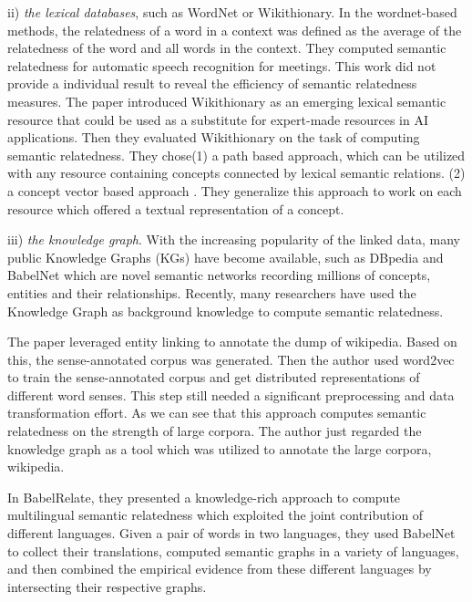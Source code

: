 ii) \emph{the lexical databases}, such as WordNet or Wikithionary. 
In the wordnet-based methods\cite{acl/Pucher07}, the relatedness of a word in a context was
defined as the average of the relatedness of the word and all words in the context. They computed
semantic relatedness for automatic speech recognition for meetings. This work did not provide a individual result
to reveal the efficiency of semantic relatedness measures.
The paper \cite{aaai/ZeschMG08} introduced Wikithionary as an emerging lexical semantic resource
that could be used as a substitute for expert-made resources in AI applications.
Then they evaluated Wikithionary on the task of computing semantic relatedness.
They chose(1) a path based approach\cite{its/Rada89}, which can be utilized with any
resource containing concepts connected by lexical semantic relations. (2) a concept vector based approach
\cite{ijcai/GabrilovichM07}. They generalize this approach to work on each
resource which offered a textual representation of a concept.

iii) \emph{the knowledge graph}. 
With the increasing popularity of the linked data, many public Knowledge Graphs (KGs) have
become available, such as DBpedia and BabelNet which are novel semantic networks recording millions
of concepts, entities and their relationships. Recently, many researchers have used the Knowledge Graph as
background knowledge to compute semantic relatedness. 

The paper\cite{acl/IacobacciPN15} leveraged entity linking to annotate the dump of wikipedia. Based on this,
the sense-annotated corpus was generated. Then the author used word2vec to
train the sense-annotated corpus and get distributed representations of different 
word senses. This step still needed a significant preprocessing and data transformation effort. 
As we can see that this approach computes semantic relatedness on the strength of large corpora.
The author just regarded the knowledge graph as a tool which was utilized to annotate the large corpora, wikipedia.  

In BabelRelate\cite{aaai/NavigliP12}, they presented a knowledge-rich approach to compute multilingual semantic
relatedness which exploited the joint contribution of different languages. Given a pair of words 
in two languages, they used BabelNet to collect their translations, computed semantic
graphs in a variety of languages, and then combined the empirical evidence from these 
different languages by intersecting their respective graphs.


